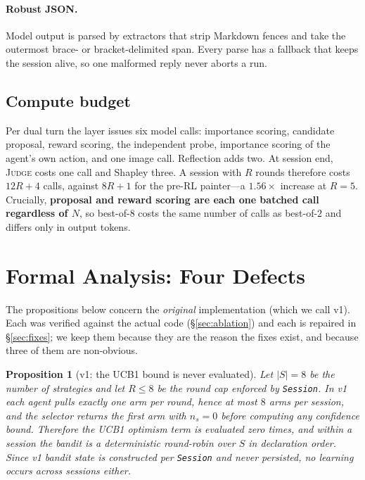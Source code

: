 \documentclass[11pt]{article}
\newcommand{\code}[1]{\texttt{\small #1}}
\newcommand{\JUDGE}{\textsc{Judge}}
\theoremstyle{plain}
\newtheorem{proposition}{Proposition}
\theoremstyle{definition}
\begin{document}
\paragraph{Robust JSON.}
Model output is parsed by extractors that strip Markdown fences and take the
outermost brace- or bracket-delimited span. Every parse has a fallback that keeps
the session alive, so one malformed reply never aborts a run.

\subsection{Compute budget}
\label{sec:compute}
Per dual turn the layer issues six model calls: importance scoring, candidate
proposal, reward scoring, the independent probe, importance scoring of the
agent's own action, and one image call. Reflection adds two. At session end,
\JUDGE{} costs one call and Shapley three. A session with $R$ rounds therefore
costs $12R + 4$ calls, against $8R + 1$ for the pre-RL painter---a $1.56\times$
increase at $R{=}5$. Crucially, \textbf{proposal and reward scoring are each one
batched call regardless of $N$}, so best-of-$8$ costs the same number of calls as
best-of-$2$ and differs only in output tokens.

\section{Formal Analysis: Four Defects}
\label{sec:analysis}
The propositions below concern the \emph{original} implementation (which we call
v1). Each was verified against the actual code (\S\ref{sec:ablation}) and each is
repaired in \S\ref{sec:fixes}; we keep them because they are the reason the fixes
exist, and because three of them are non-obvious.

\begin{proposition}[v1: the UCB1 bound is never evaluated]
\label{prop:bandit}
Let $|S| = 8$ be the number of strategies and let $R \le 8$ be the round cap
enforced by \code{Session}. In v1 each agent pulls exactly one arm per round,
hence at most $8$ arms per session, and the selector returns the first arm with
$n_s = 0$ before computing any confidence bound. Therefore the UCB1 optimism term
is evaluated zero times, and within a session the bandit is a deterministic
round-robin over $S$ in declaration order. Since v1 bandit state is constructed
per \code{Session} and never persisted, no learning occurs across sessions
either.
\end{proposition}
\end{document}
